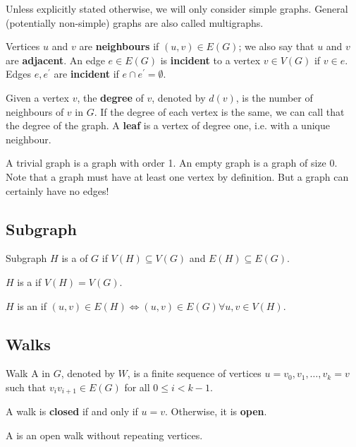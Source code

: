 \begin{remark}
Unless explicitly stated otherwise, we will only consider simple graphs. General (potentially non-simple) graphs are also called multigraphs.
\end{remark}

Vertices $u$ and $v$ are \textbf{neighbours} if $(u,v) \in E(G)$; we also say that $u$ and $v$ are \textbf{adjacent}. An edge $e \in E(G)$ is \textbf{incident} to a vertex $v \in V(G)$ if $v \in e$. Edges $e, e^\prime$ are \textbf{incident} if $e \cap e^\prime = \emptyset$.

Given a vertex $v$, the \textbf{degree} of $v$, denoted by $d(v)$, is the number of neighbours of $v$ in $G$. If the degree of each vertex is the same, we can call that the degree of the graph. A \textbf{leaf} is a vertex of degree one, i.e. with a unique neighbour.

\begin{remark}
A trivial graph is a graph with order 1. An empty graph is a graph of size 0. 
Note that a graph must have at least one vertex by definition. But a graph can certainly have no edges!
\end{remark}

\subsection{Subgraph}
\begin{defn}{Subgraph}{}
$H$ is a  of $G$ if $V(H) \subseteq V(G)$ and $E(H) \subseteq E(G)$.
\end{defn}

$H$ is a  if $V(H)=V(G)$.

$H$ is an  if $(u,v) \in E(H) \iff (u,v) \in E(G) \forall u, v \in V(H)$.

\subsection{Walks}
\begin{defn}{Walk}{}
A  in $G$, denoted by $W$, is a finite sequence of vertices $u=v_0,v_1,\dots,v_k=v$ such that $v_i v_{i+1} \in E(G)$ for all $0 \le i < k-1$.
\end{defn}

A walk is \textbf{closed} if and only if $u=v$. Otherwise, it is \textbf{open}.

A  is an open walk without repeating vertices.

